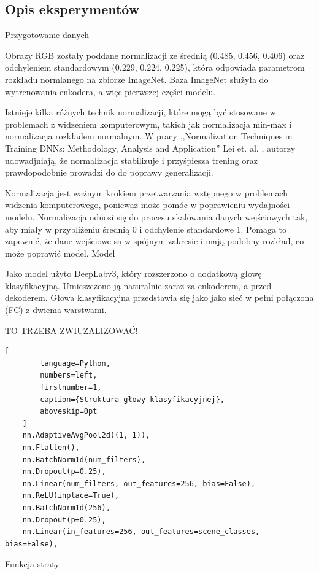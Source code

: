 \subsection{Opis eksperymentów}
\noindent
Przygotowanie danych

Obrazy RGB zostały poddane normalizacji ze średnią (0.485, 0.456, 0.406) oraz odchyleniem standardowym (0.229, 0.224, 0.225), która odpowiada parametrom rozkładu normlanego na zbiorze ImageNet. Baza ImageNet służyła do wytrenowania enkodera, a więc pierwszej części modelu.

Istnieje kilka różnych technik normalizacji, które mogą być stosowane w problemach z widzeniem komputerowym, takich jak normalizacja min-max i normalizacja rozkładem normalnym.  W pracy ,,Normalization Techniques in Training DNNs:
Methodology, Analysis and Application'' Lei et. al. \cite{huang2020normalization}, autorzy udowadjniają, że normalizacja stabilizuje i przyśpiesza trening oraz prawdopodobnie prowadzi do
do poprawy generalizacji. 

Normalizacja jest ważnym krokiem przetwarzania wstępnego w problemach widzenia komputerowego, ponieważ może pomóc w poprawieniu wydajności modelu. Normalizacja odnosi się do procesu skalowania danych wejściowych tak, aby miały w przybliżeniu średnią 0 i odchylenie standardowe 1. Pomaga to zapewnić, że dane wejściowe są w spójnym zakresie i mają podobny rozkład, co może poprawić model.
\noindent
Model

Jako  model użyto DeepLabv3, który rozszerzono o dodatkową głowę klasyfikacyjną. Umieszczono ją naturalnie zaraz za enkoderem, a przed dekoderem. Głowa klasyfikacyjna przedstawia się jako jako sieć w pełni połączona (FC) z dwiema warstwami.  

TO TRZEBA ZWIUZALIZOWAĆ!
\begin{addmargin}[6mm]{0mm}
    \begin{lstlisting}[
        language=Python,
        numbers=left,
        firstnumber=1,
        caption={Struktura głowy klasyfikacyjnej},
        aboveskip=0pt
    ]
    nn.AdaptiveAvgPool2d((1, 1)),
    nn.Flatten(),
    nn.BatchNorm1d(num_filters),
    nn.Dropout(p=0.25),
    nn.Linear(num_filters, out_features=256, bias=False),
    nn.ReLU(inplace=True),
    nn.BatchNorm1d(256),
    nn.Dropout(p=0.25),
    nn.Linear(in_features=256, out_features=scene_classes, bias=False),
    \end{lstlisting}
    \end{addmargin}

\noindent
Funkcja straty

